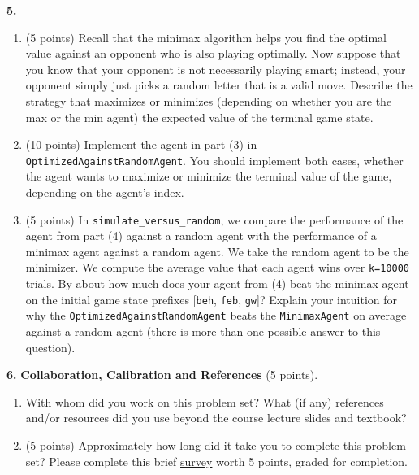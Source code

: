 \documentclass[12pt]{amsart}
\newenvironment{statement}[1]{\smallskip\noindent\color[rgb]{0.0,0.0,0.0} {\bf #1.}}{}
\newcommand{\1}{\mathds{1}}
\begin{document}
\begin{statement}{5}
\begin{enumerate}
    \item (5 points) Recall that the minimax algorithm helps you find the optimal value against an opponent who is also playing optimally. Now suppose that you know that your opponent is not necessarily playing smart; instead, your opponent simply just picks a random letter that is a valid move.
    Describe the strategy that maximizes or minimizes (depending on whether you are the max or the min agent) the expected value of the terminal game state.
    \item (10 points) Implement the agent in part (3) in \texttt{OptimizedAgainstRandomAgent}. You should implement both cases, whether the agent wants to maximize or minimize the terminal value of the game, depending on the agent's index.
    \item (5 points) In \texttt{simulate\_versus\_random}, we compare the performance of the agent from part (4) against a random agent with the performance of a minimax agent against a random agent.
    We take the random agent to be the minimizer.
    We compute the average value that each agent wins over \texttt{k=10000} trials. By about how much does your agent from (4) beat the minimax agent on the initial game state prefixes  [\texttt{beh}, \texttt{feb}, \texttt{gw}]?
    Explain your intuition for why the \texttt{OptimizedAgainstRandomAgent} beats the \texttt{MinimaxAgent} on average against a random agent (there is more than one possible answer to this question).
\end{enumerate}
\end{statement}

\newpage

\begin{statement}{6}
\noindent \textbf{Collaboration, Calibration and References} (5 points).
\begin{enumerate}
    \item With whom did you work on this problem set? What (if any) references and/or resources did you use beyond the course lecture slides and textbook? 
    \item (5 points) Approximately how long did it take you to complete this problem set? Please complete this brief \href{https://forms.gle/S3UGVtR8jDf4gQvN7}{survey} worth 5 points, graded for completion.
\end{enumerate}
\end{statement}
\end{document}
